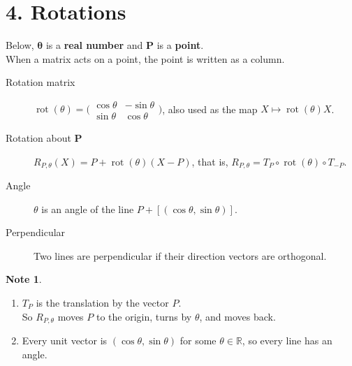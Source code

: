 \documentclass[11pt,a4paper]{article}
\theoremstyle{boxed}
\theoremstyle{definition}
\newtheorem*{note}{Note}
\newenvironment{plate}{\par\medskip\noindent\begin{minipage}{\linewidth}\centering}{\end{minipage}\par\medskip}
\newcommand{\R}{\mathbb{R}}
\DeclareMathOperator{\rot}{rot}
\newcommand{\eqtick}[2]{\draw ($(#1)!0.5!(#2)!1.2mm!90:(#2)$) -- ($(#1)!0.5!(#2)!1.2mm!-90:(#2)$);}
\begin{document}
\begin{plate}
\label{fig:bisector}
\end{plate}

\newpage
\section*{4. Rotations}

Below, $\boldsymbol{\theta}$ is a \textbf{real number} and $\boldsymbol{P}$ is a \textbf{point}.\\
When a matrix acts on a point, the point is written as a column.
\begin{description}
    \item[Rotation matrix] $\rot(\theta)=\bigl(\begin{smallmatrix}\cos\theta & -\sin\theta\\ \sin\theta & \cos\theta\end{smallmatrix}\bigr)$, also used as the map $X\mapsto\rot(\theta)X$.
    \item[Rotation about $\boldsymbol{P}$] $R_{P,\theta}(X)=P+\rot(\theta)(X-P)$, that is, $R_{P,\theta}=T_P\circ\rot(\theta)\circ T_{-P}$.
    \item[Angle] $\theta$ is an angle of the line $P+[(\cos\theta,\sin\theta)]$.
    \item[Perpendicular] Two lines are perpendicular if their direction vectors are orthogonal.
\end{description}

\begin{note}
\leavevmode
\begin{enumerate}[label=\arabic*.]
    \item $T_P$ is the translation by the vector $P$.\\
    So $R_{P,\theta}$ moves $P$ to the origin, turns by $\theta$, and moves back.
    \item Every unit vector is $(\cos\theta,\sin\theta)$ for some $\theta\in\R$, so every line has an angle.
\end{enumerate}
\end{note}
\end{document}
